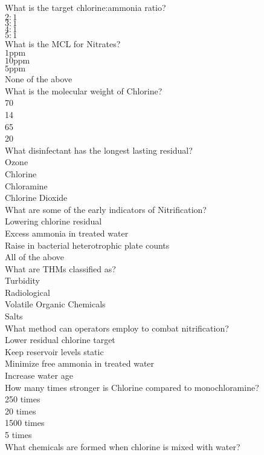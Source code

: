   What is the target chlorine:ammonia ratio?\\
$2: 1$\\
$3: 1$\\
$4: 1$\\
$5: 1$\\
 What is the MCL for Nitrates?\\
$1 \mathrm{ppm}$\\
$10 \mathrm{ppm}$\\
$5 \mathrm{ppm}$\\
None of the above\\
 What is the molecular weight of Chlorine?\\
70\\
14\\
65\\
20\\
 What disinfectant has the longest lasting residual?\\
Ozone\\
Chlorine\\
Chloramine\\
Chlorine Dioxide\\
 What are some of the early indicators of Nitrification?\\
Lowering chlorine residual\\
Excess ammonia in treated water\\
Raise in bacterial heterotrophic plate counts\\
All of the above\\
 What are THMs classified as?\\
Turbidity\\
Radiological\\
Volatile Organic Chemicals\\
Salts\\
 What method can operators employ to combat nitrification?\\
Lower residual chlorine target\\
Keep reservoir levels static\\
Minimize free ammonia in treated water\\
Increase water age\\
 How many times stronger is Chlorine compared to monochloramine?\\
250 times\\
20 times\\
1500 times\\
5 times\\
What chemicals are formed when chlorine is mixed with water?\\
